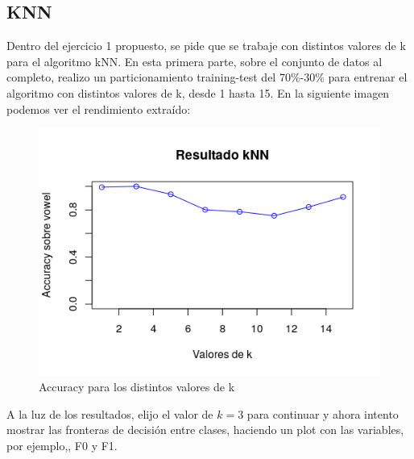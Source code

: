 \subsection{KNN}

Dentro del ejercicio 1 propuesto, se pide que se trabaje con distintos valores de k para el algoritmo kNN. En esta primera parte, sobre el conjunto de datos al completo, realizo un particionamiento training-test del 70\%-30\% para entrenar el algoritmo con distintos valores de k, desde 1 hasta 15. En la siguiente imagen podemos ver el rendimiento extraído:

\begin{figure}[H] %
	\centering
	\includegraphics[scale=0.8]{k-values.png}  %
	\caption{Accuracy para los distintos valores de k} 
	\label{fig:k-values}
\end{figure}

A la luz de los resultados, elijo el valor de $k=3$ para continuar y ahora intento mostrar las fronteras de decisión entre clases, haciendo un plot con las variables, por ejemplo,, F0 y F1.

